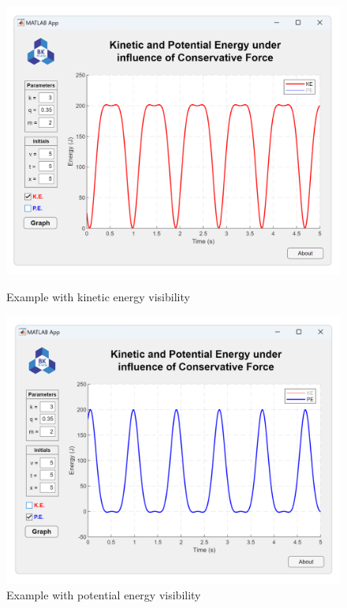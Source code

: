 \documentclass[13pt,a4paper]{report}
\begin{document}
\vspace{0.2cm}
\begin{figure}[!htb]
    \centering
    \begin{minipage}{.5\textwidth}
        \centering
        \includegraphics[scale=0.21]{result2_1.png}
  \vspace{-0.75cm}
        \caption{Example with kinetic energy visibility}
    \end{minipage}%
    \begin{minipage}{0.5\textwidth}
        \centering
        \includegraphics[scale=0.21]{result2_2.png}
  \vspace{-0.75cm}
        \caption{Example with potential energy visibility}
    \end{minipage}
\end{figure}
\end{document}
